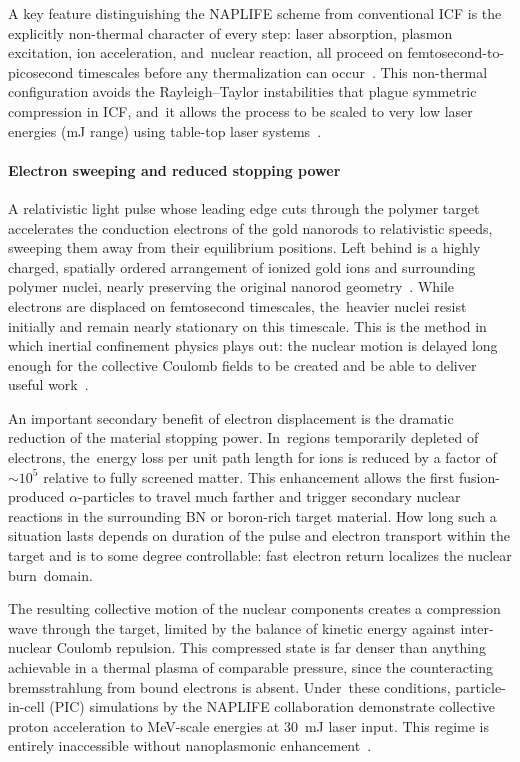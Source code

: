 \documentclass[particles,article,accept,pdftex,moreauthors]{Definitions/mdpi}
\begin{document}
A key feature distinguishing the NAPLIFE scheme from conventional ICF is the explicitly non-thermal character of every step: laser absorption, plasmon excitation, ion acceleration, and~nuclear reaction, all proceed on femtosecond-to-picosecond timescales before any thermalization can occur~\cite{Csernai:2025EPJ}. This non-thermal configuration avoids the Rayleigh--Taylor instabilities that plague symmetric compression in ICF, and~it allows the process to be scaled to very low laser energies (mJ range) using table-top laser systems~\cite{Biro:2023Univ}.

\vspace{-6pt}\paragraph*{\bf Electron sweeping and reduced stopping power}
A relativistic light pulse whose leading edge cuts through the polymer target accelerates the conduction electrons of the gold nanorods to relativistic speeds, sweeping them away from their equilibrium positions. Left behind is a highly charged, spatially ordered arrangement of ionized gold ions and surrounding polymer nuclei, nearly preserving the original nanorod geometry~\cite{Papp:2022PRXEnergy}. While electrons are displaced on femtosecond timescales, the~heavier nuclei resist initially and remain nearly stationary on this timescale. This is the method in which inertial confinement physics plays out: the nuclear motion is delayed long enough for the collective Coulomb fields to be created and be able to deliver useful work~\cite{Zweiback:00Coul}.

An important secondary benefit of electron displacement is the dramatic reduction of the material stopping power. In~regions temporarily depleted of electrons, the~energy loss per unit path length for ions is reduced by a factor of ${\sim}10^5$ relative to fully screened matter. This enhancement allows the first fusion-produced $\alpha$-particles to travel much farther and trigger secondary nuclear reactions in the surrounding BN or boron-rich target material. How long such a situation lasts depends on duration of the pulse and electron transport within the target and is to some degree controllable: fast electron return localizes the nuclear burn~domain.

The resulting collective motion of the nuclear components creates a compression wave through the target, limited by the balance of kinetic energy against inter-nuclear Coulomb repulsion. This compressed state is far denser than anything achievable in a thermal plasma of comparable pressure, since the counteracting bremsstrahlung from bound electrons is absent. Under~these conditions, particle-in-cell (PIC) simulations by the NAPLIFE collaboration demonstrate collective proton acceleration to MeV-scale energies at 30~mJ laser input. This regime is entirely inaccessible without nanoplasmonic enhancement~\cite{Papp:2023arXiv}.
\end{document}

